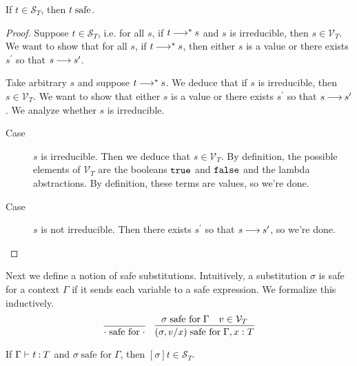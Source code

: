 \documentclass[11pt,letterpaper]{article}
\begin{document}
\renewcommand{\S}{\mathcal{S}}
\renewcommand{\V}{\mathcal{V}}

\begin{prop}
  If $t \in \S_T$, then $t \;\text{safe}$.
\end{prop}

\begin{proof}
  Suppose $t \in \S_T$, i.e. for all $s$, if $t \mathbin{\longrightarrow}^* s$ and $s$ is
  irreducible, then $s \in \V_T$.
  We want to show that for all $s$, if $t \mathbin{\longrightarrow}^* s$, then either $s$ is a
  value or there exists $s^\prime$ so that $s \mathbin{\longrightarrow} s^\prime$.

  Take arbitrary $s$ and suppose $t \mathbin{\longrightarrow}^* s$.
  We deduce that if $s$ is irreducible, then $s \in \V_T$.
  We want to show that either $s$ is a value or there exists $s^\prime$ so that
  $s \mathbin{\longrightarrow} s^\prime$.
  We analyze whether $s$ is irreducible.
  \begin{description}
    \item[Case] $s$ is irreducible.
      Then we deduce that $s \in \V_T$.
      By definition, the possible elements of $\V_T$ are the booleans $\mathtt{true}$
      and $\mathtt{false}$ and the lambda abstractions.
      By definition, these terms are values, so we're done.
    \item[Case] $s$ is not irreducible.
      Then there exists $s^\prime$ so that $s \mathbin{\longrightarrow} s^\prime$, so we're done.
  \end{description}
\end{proof}

Next we define a notion of safe substitutions.
Intuitively, a substitution $\sigma$ is safe for a context $\Gamma$ if it sends
each variable to a safe expression.
We formalize this inductively.
\newcommand{\safefor}{\;\text{safe for}\;}
%
\begin{equation*}
  \infer{\cdot \safefor \cdot}{}
  \quad
  \infer{(\sigma, v/x) \safefor \Gamma, x:T}{
    \sigma \safefor \Gamma
    &
    v \in \V_T
  }
\end{equation*}

\begin{prop}
  If $\Gamma \vdash t \mathbin{:} T$ and $\sigma \safefor \Gamma$,
  then $[\sigma]t \in \S_T$.
\end{prop}
\end{document}
